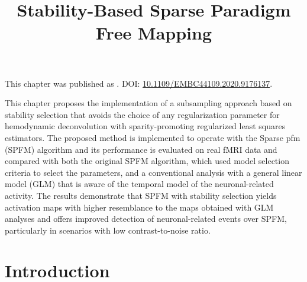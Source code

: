 \title{Stability-Based Sparse Paradigm Free Mapping}
\label{cha:stability}

\begin{framed}\noindent This chapter was published as
    . DOI:
    \url{10.1109/EMBC44109.2020.9176137}.
\end{framed}

This chapter proposes the implementation of a subsampling approach based on
stability selection that avoids the choice of any regularization parameter for
hemodynamic deconvolution with sparity-promoting regularized least squares
estimators. The proposed method is implemented to operate with the Sparse
\acrlong*{pfm} (SPFM) algorithm and its performance is evaluated on real fMRI
data and compared with both the original SPFM algorithm, which used model
selection criteria to select the parameters, and a conventional analysis with a
general linear model (GLM) that is aware of the temporal model of the
neuronal-related activity. The results demonstrate that SPFM with stability
selection yields activation maps with higher resemblance to the maps obtained
with GLM analyses and offers improved detection of neuronal-related events over
SPFM, particularly in scenarios with low contrast-to-noise ratio.

\section{Introduction}
\label{sec:stability_introduction}

